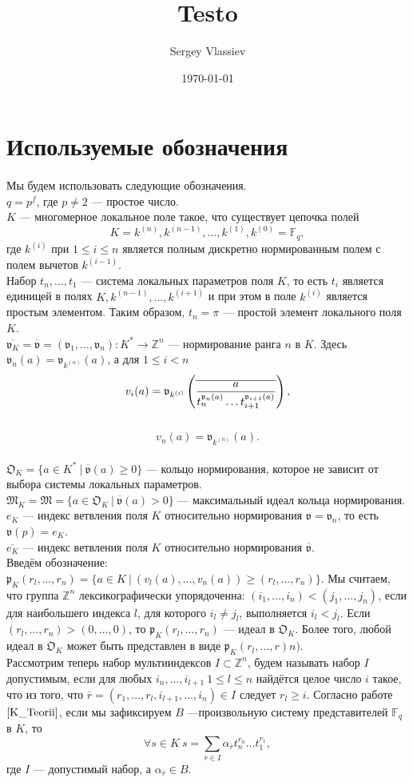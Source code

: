 \documentclass[a4paper]{article}
\title{Testo}
\author{Sergey Vlassiev}
\date{\today}
\newcommand{\Fq}{\mathbb{F}_q}
\newcommand{\Z}{\mathbb{Z}}
\newcommand{\MK}{\mathfrak{M}_K}
\newcommand{\OK}{\mathfrak{O}_K}
\newcommand{\val}{\mathfrak{v}}
\newcommand{\olval}{\overline{\mathfrak{v}}}
\newcommand{\pK}{\mathfrak{p}_K}
\newcommand{\Leq}{\leqslant}
\newcommand{\Geq}{\geqslant}
\begin{document}
\section{Используемые обозначения}
\paragraph{}
Мы будем использовать следующие обозначения.\\
$q=p^f$, где $p\neq2$ --- простое число.\\
$K$ --- многомерное локальное поле такое, что существует цепочка полей 
$$K=k^{(n)}, k^{(n-1)},\dots,k^{(1)},k^{(0)}=\Fq,$$
где $k^{(i)}$ при $1\Leq i\Leq n$ является полным дискретно нормированным полем с полем вычетов $k^{(i-1)}$.\\
Набор $t_n,\dots,t_1$ --- система локальных параметров поля $K$, то есть $t_i$ является единицей в полях $K,k^{(n-1)},\dots,k^{(i+1)}$ и при этом в поле $k^{(i)}$ является простым элементом. Таким образом, $t_n=\pi$ --- простой элемент локального поля $K$.\\
$\overline{\val_K}=\olval=(\val_1,\dots,\val_n):K^*\rightarrow\Z^n$ --- нормирование ранга $n$ в $K$. Здесь $\val_n(a)=\val_{k^{(n)}}(a)$, а для $1\Leq i<n$
$$v_i(a) = \val_{k^{(i)}} \left( \overline {a \over { t_n^{\val_n(a)} \ldots t_{i+1}^{\val_{i+1}(a)} } } \right),$$\\
$$v_n(a)=\val_{k^{(n)}}(a).$$\\
$\OK=\{a\in K^*\ |\ \overline{\val}(a)\Geq0\}$ --- кольцо нормирования, которое не зависит от выбора системы локальных параметров.\\
$\MK=\mathfrak{M}=\{a\in\OK\ |\ \overline{\val}(a)>0\}$ --- максимальный идеал кольца нормирования.\\
$e_K$ --- индекс ветвления поля $K$ относительно нормирования $\val=\val_n$, то есть $\val(p)=e_K$.\\
$\overline{e_K}$ --- индекс ветвления поля $K$ относительно нормирования $\olval$.\\
Введём обозначение: $\pK(r_l,\dots,r_n)=\{a\in K\ |\ (v_l(a),\dots,v_n(a))\Geq(r_l,\dots,r_n)\}$. Мы считаем, что группа $\Z^n$ лексикографически упорядоченна: $(i_1,\dots,i_n)<(j_1,\dots,j_n)$, если для наибольшего индекса $l$, для которого $i_l\neq j_l$, выполняется $i_l<j_l$. Если $(r_l,\dots,r_n)>(0,\dots,0)$, то $\pK(r_l,\dots,r_n)$ --- идеал в $\OK$. Более того, любой идеал в $\OK$ может быть представлен в виде $\pK(r_l,\dots,r)n)$.\\
Рассмотрим теперь набор мультииндексов $I\subset\Z^n$, будем называть набор $I$ допустимым, если для любых $i_n,\dots,i_{l+1}\ 1\Leq l\Leq n$ найдётся целое число $i$ такое, что из того, что $\overline{r}=(r_1,\dots,r_l,i_{l+1},\dots,i_n)\in I$ следует $r_l\Geq i$. Согласно работе $\cite{K_Teorii}$, если мы зафиксируем $B$ ---произвольную систему представителей $\Fq$ в $K$, то
$$\forall s \in K\ s= \sum_{\overline{r} \in I} \alpha_{\overline{r}} t_n^{r_n} \ldots t_1^{r_1},$$
где $I$ --- допустимый набор, а $\alpha_{\overline{r}}\in B$.\\
\end{document}
